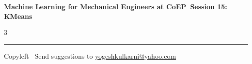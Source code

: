 \documentclass[8pt,landscape]{article}
\begin{document}
\footnotesize

\begin{center}
\Large{\textbf{Machine Learning for Mechanical Engineers at CoEP\ Session 15: KMeans}}
\end{center}

\begin{multicols}{3}

\end{multicols}

\rule{\linewidth}{0.25pt}
\scriptsize
Copyleft \textcopyleft\  Send suggestions to
\href{http://www.yogeshkulkarni.com}{yogeshkulkarni@yahoo.com}
\end{document}
